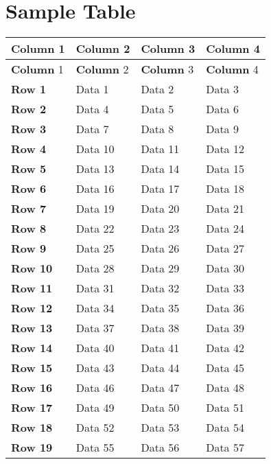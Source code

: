 \chapter{Sample Table}
    \begin{longtable}{|l|l|l|l|}
        \hline
        \textbf{Column} 1 & \textbf{Column} 2 & \textbf{Column} 3 & \textbf{Column} 4 \\\hline
        \endfirsthead
        \hline
        \textbf{Column} 1 & \textbf{Column} 2 & \textbf{Column} 3 & \textbf{Column} 4 \\\hline
        \endhead
        \hline
        \endfoot
        \endlastfoot
        \textbf{Row 1} & Data 1 & Data 2 & Data 3 \\\hline
        \textbf{Row 2} & Data 4 & Data 5 & Data 6 \\\hline
        \textbf{Row 3} & Data 7 & Data 8 & Data 9 \\\hline
        \textbf{Row 4} & Data 10 & Data 11 & Data 12 \\\hline
        \textbf{Row 5} & Data 13 & Data 14 & Data 15 \\\hline
        \textbf{Row 6} & Data 16 & Data 17 & Data 18 \\\hline
        \textbf{Row 7} & Data 19 & Data 20 & Data 21 \\\hline
        \textbf{Row 8} & Data 22 & Data 23 & Data 24 \\\hline
        \textbf{Row 9} & Data 25 & Data 26 & Data 27 \\\hline
        \textbf{Row 10} & Data 28 & Data 29 & Data 30 \\\hline
        \textbf{Row 11} & Data 31 & Data 32 & Data 33 \\\hline
        \textbf{Row 12} & Data 34 & Data 35 & Data 36 \\\hline
        \textbf{Row 13} & Data 37 & Data 38 & Data 39 \\\hline
        \textbf{Row 14} & Data 40 & Data 41 & Data 42 \\\hline
        \textbf{Row 15} & Data 43 & Data 44 & Data 45 \\\hline
        \textbf{Row 16} & Data 46 & Data 47 & Data 48 \\\hline
        \textbf{Row 17} & Data 49 & Data 50 & Data 51 \\\hline
        \textbf{Row 18} & Data 52 & Data 53 & Data 54 \\\hline
        \textbf{Row 19} & Data 55 & Data 56 & Data 57 \\\hline

\end{longtable}
